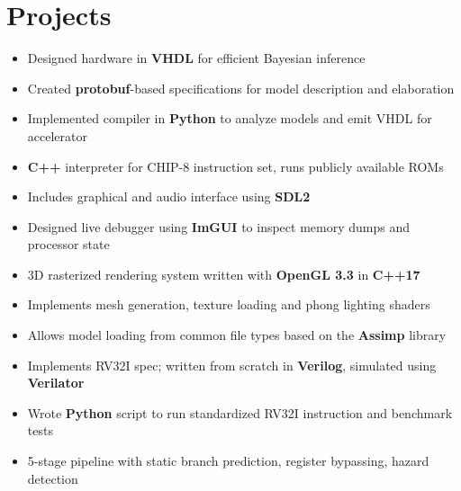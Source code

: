 \documentclass{moderncv}
\begin{document}
\section{Projects}
{\begin{itemize}
    \item Designed hardware in \textbf{VHDL} for efficient Bayesian inference
    \item Created \textbf{protobuf}-based specifications for model description and elaboration
    \item Implemented compiler in \textbf{Python} to analyze models and emit VHDL for accelerator
\end{itemize}}

{\begin{itemize}
    \item \textbf{C++} interpreter for CHIP-8 instruction set, runs publicly available ROMs
    \item Includes graphical and audio interface using \textbf{SDL2}
    \item Designed live debugger using \textbf{ImGUI} to inspect memory dumps and processor state
\end{itemize}}

{\begin{itemize}
    \item 3D rasterized rendering system written with \textbf{OpenGL 3.3} in \textbf{C++17}
    \item Implements mesh generation, texture loading and phong lighting shaders
    \item Allows model loading from common file types based on the \textbf{Assimp} library
\end{itemize}}

{\begin{itemize}
    \item Implements RV32I spec; written from scratch in \textbf{Verilog}, simulated using \textbf{Verilator}
    \item Wrote \textbf{Python} script to run standardized RV32I instruction and benchmark tests
    \item 5-stage pipeline with static branch prediction, register bypassing, hazard detection
\end{itemize}}
\end{document}
